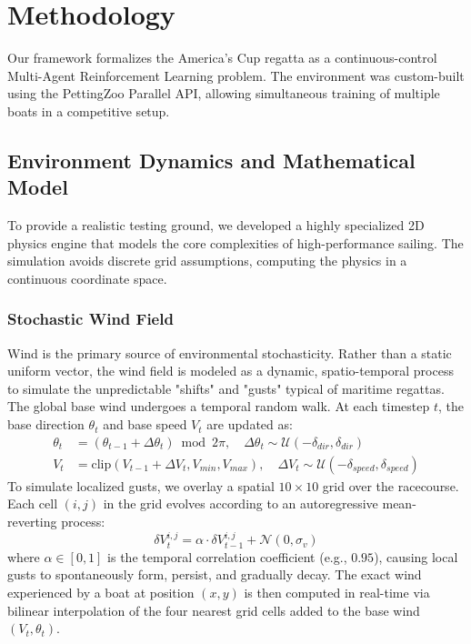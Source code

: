 \documentclass{article}
\begin{document}
\section{Methodology}
Our framework formalizes the America's Cup regatta as a continuous-control Multi-Agent Reinforcement Learning problem. The environment was custom-built using the PettingZoo Parallel API, allowing simultaneous training of multiple boats in a competitive setup.

\subsection{Environment Dynamics and Mathematical Model}
To provide a realistic testing ground, we developed a highly specialized 2D physics engine that models the core complexities of high-performance sailing. The simulation avoids discrete grid assumptions, computing the physics in a continuous coordinate space.

\subsubsection{Stochastic Wind Field}
Wind is the primary source of environmental stochasticity. Rather than a static uniform vector, the wind field is modeled as a dynamic, spatio-temporal process to simulate the unpredictable "shifts" and "gusts" typical of maritime regattas. 
The global base wind undergoes a temporal random walk. At each timestep $t$, the base direction $\theta_t$ and base speed $V_t$ are updated as:
\begin{align}
    \theta_t &= \left(\theta_{t-1} + \Delta\theta_t\right) \bmod 2\pi, \quad \Delta\theta_t \sim \mathcal{U}(-\delta_{dir}, \delta_{dir}) \\
    V_t &= \text{clip}(V_{t-1} + \Delta V_t, V_{min}, V_{max}), \quad \Delta V_t \sim \mathcal{U}(-\delta_{speed}, \delta_{speed})
\end{align}
To simulate localized gusts, we overlay a spatial $10 \times 10$ grid over the racecourse. Each cell $(i,j)$ in the grid evolves according to an autoregressive mean-reverting process:
\begin{equation}
    \delta V^{i,j}_t = \alpha \cdot \delta V^{i,j}_{t-1} + \mathcal{N}(0, \sigma_v)
\end{equation}
where $\alpha \in [0, 1]$ is the temporal correlation coefficient (e.g., $0.95$), causing local gusts to spontaneously form, persist, and gradually decay. The exact wind experienced by a boat at position $(x,y)$ is then computed in real-time via bilinear interpolation of the four nearest grid cells added to the base wind $(V_t, \theta_t)$.
\end{document}
